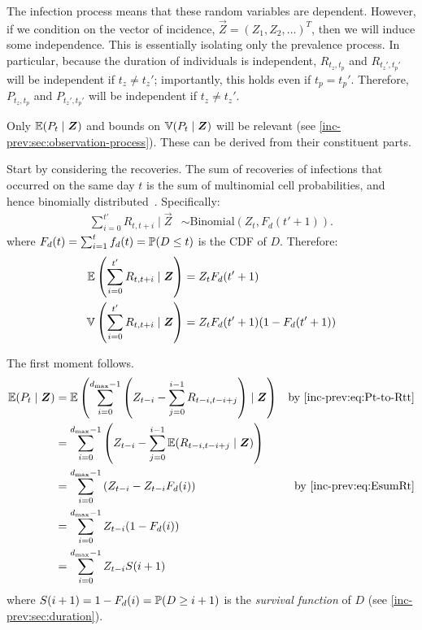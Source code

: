 \documentclass[thesis.tex]{subfiles}
\begin{document}
The infection process means that these random variables are dependent.
However, if we condition on the vector of incidence, $\vec{Z} = (Z_1, Z_2, \dots)^T$, then we will induce some independence.
This is essentially isolating only the prevalence process.
In particular, because the duration of individuals is independent, $R_{t_z,t_p}$ and $R_{t_z',t_p'}$ will be independent if $t_z \neq t_z'$; importantly, this holds even if $t_p = t_p'$.
Therefore, $P_{t_z,t_p}$ and $P_{t_z',t_p'}$ will be independent if $t_z \neq t_z'$.

Only $\operatorname{\mathbb{E}}(P_t \mid \bm{Z})$ and bounds on $\operatorname{\mathbb{V}}(P_t \mid \bm{Z})$ will be relevant (see \cref{inc-prev:sec:observation-process}).
These can be derived from their constituent parts.

Start by considering the recoveries.
The sum of recoveries of infections that occurred on the same day $t$ is the sum of multinomial cell probabilities, and hence binomially distributed~\autocite{alamAnalysis}.
Specifically:
\begin{align}
  \sum_{i=0}^{t'} R_{t,t+i} \mid \vec{Z} &\sim \text{Binomial}(Z_t, F_d(t'+1)). \label{inc-prev:eq:binomialRt}
\end{align}
where $F_d(t) = \sum_{i=1}^t f_d(t) = \operatorname{\mathbb{P}}(D \leq t)$ is the CDF of $D$.
Therefore:
\begin{align}
  \operatorname{\mathbb{E}} \left( \sum_{i=0}^{t'} R_{t,t+i} \mid \bm{Z} \right) &= Z_t F_d(t'+1) \label{inc-prev:eq:EsumRt} \\
  \operatorname{\mathbb{V}} \left( \sum_{i=0}^{t'} R_{t,t+i} \mid \bm{Z} \right) &= Z_t F_d(t'+1) (1 - F_d(t'+1)) \label{inc-prev:eq:VsumRt}
\end{align}

The first moment follows.
\begin{align}
\E(P_t \mid \vec{Z})
  &= \E\left(\sum_{i=0}^{d_\text{max}-1} \left( Z_{t-i} - \sum_{j=0}^{i-1} R_{t-i,t-i+j} \right) \mid \vec{Z} \right) &\text{by \cref{inc-prev:eq:Pt-to-Rtt}}\\
  &= \sum_{i=0}^{d_\text{max}-1} \left( Z_{t-i} - \sum_{j=0}^{i-1} \E( R_{t-i,t-i+j} \mid \vec{Z}) \right) \\
  &= \sum_{i=0}^{d_\text{max}-1} \left( Z_{t-i} - Z_{t-i} F_d(i) \right) &\text{by \cref{inc-prev:eq:EsumRt}}\\
  &= \sum_{i=0}^{d_\text{max}-1} Z_{t-i} (1 - F_d(i)) \\
  &= \sum_{i=0}^{d_\text{max}-1} Z_{t-i} S(i+1)
\end{align}
where $S(i+1) = 1-F_d(i) = \operatorname{\mathbb{P}}(D \geq i+1)$ is the \emph{survival function} of $D$ (see \cref{inc-prev:sec:duration}).
\end{document}
